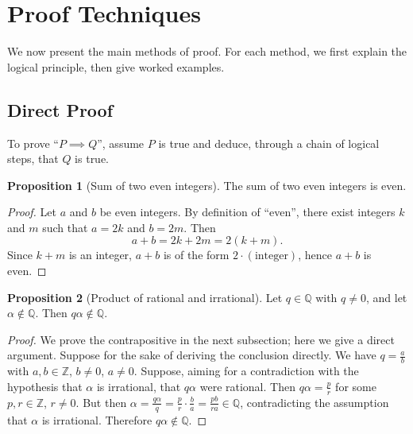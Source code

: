 \documentclass[12pt,a4paper,openany]{book}
\newcommand{\Z}{\mathbb{Z}}
\newcommand{\Q}{\mathbb{Q}}
\theoremstyle{definition}
\newtheorem{proposition}{Proposition}[chapter]
\theoremstyle{remark}
\begin{document}
\section{Proof Techniques}
\label{sec:proof-techniques}

We now present the main methods of proof.  For each method, we first explain
the logical principle, then give worked examples.

\subsection{Direct Proof}
\label{subsec:direct-proof}

\begin{strategy}
To prove ``$P \implies Q$'', assume $P$ is true and deduce, through a chain
of logical steps, that $Q$ is true.
\end{strategy}

\begin{proposition}[Sum of two even integers]\label{prop:sum-even}
The sum of two even integers is even.
\end{proposition}

\begin{proof}
Let $a$ and $b$ be even integers.  By definition of ``even'', there exist integers $k$ and $m$ such that $a = 2k$ and $b = 2m$.
Then
\[
  a + b = 2k + 2m = 2(k + m).
\]
Since $k + m$ is an integer, $a+b$ is of the form $2 \cdot (\text{integer})$,
hence $a+b$ is even.
\end{proof}

\begin{proposition}[Product of rational and irrational]\label{prop:rat-times-irr}
Let $q \in \Q$ with $q \neq 0$, and let $\alpha \notin \Q$.  Then
$q\alpha \notin \Q$.
\end{proposition}

\begin{proof}
We prove the contrapositive in the next subsection; here we give a direct
argument.  Suppose for the sake of deriving the conclusion directly.  We have
$q = \frac{a}{b}$ with $a,b \in \Z$, $b \neq 0$, $a \neq 0$.  Suppose, aiming
for a contradiction with the hypothesis that $\alpha$ is irrational, that
$q\alpha$ were rational.  Then $q\alpha = \frac{p}{r}$ for some $p,r\in\Z$,
$r\neq0$.  But then $\alpha = \frac{q\alpha}{q} = \frac{p}{r}\cdot\frac{b}{a}
= \frac{pb}{ra} \in \Q$, contradicting the assumption that $\alpha$ is
irrational.  Therefore $q\alpha \notin \Q$.
\end{proof}
\end{document}
